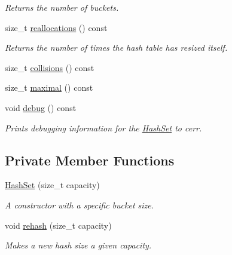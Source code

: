\begin{DoxyCompactItemize}
\begin{DoxyCompactList}\small\item\em Returns the number of buckets. \end{DoxyCompactList}\item 
\hypertarget{class_hash_set_a85c4d8f088f5679d587e06c07c362ac5}{size\-\_\-t \hyperlink{class_hash_set_a85c4d8f088f5679d587e06c07c362ac5}{reallocations} () const }\label{class_hash_set_a85c4d8f088f5679d587e06c07c362ac5}

\begin{DoxyCompactList}\small\item\em Returns the number of times the hash table has resized itself. \end{DoxyCompactList}\item 
size\-\_\-t \hyperlink{class_hash_set_a54fa80d8af72e633479aa4520a7e5d2f}{collisions} () const 
\item 
size\-\_\-t \hyperlink{class_hash_set_a21daebf2846f630ab4300c4c0468c929}{maximal} () const 
\item 
\hypertarget{class_hash_set_a83defc0197ac5362971ff18a210205f6}{void \hyperlink{class_hash_set_a83defc0197ac5362971ff18a210205f6}{debug} () const }\label{class_hash_set_a83defc0197ac5362971ff18a210205f6}

\begin{DoxyCompactList}\small\item\em Prints debugging information for the \hyperlink{class_hash_set}{Hash\-Set} to cerr. \end{DoxyCompactList}\end{DoxyCompactItemize}
\subsection*{Private Member Functions}
\begin{DoxyCompactItemize}
\item 
\hypertarget{class_hash_set_a7058a76053ccf7b2955e416e44365cf9}{\hyperlink{class_hash_set_a7058a76053ccf7b2955e416e44365cf9}{Hash\-Set} (size\-\_\-t capacity)}\label{class_hash_set_a7058a76053ccf7b2955e416e44365cf9}

\begin{DoxyCompactList}\small\item\em A constructor with a specific bucket size. \end{DoxyCompactList}\item 
void \hyperlink{class_hash_set_ae3040dd5da7885460b5b88469e9ecded}{rehash} (size\-\_\-t capacity)
\begin{DoxyCompactList}\small\item\em Makes a new hash size a given capacity. \end{DoxyCompactList}\end{DoxyCompactItemize}
